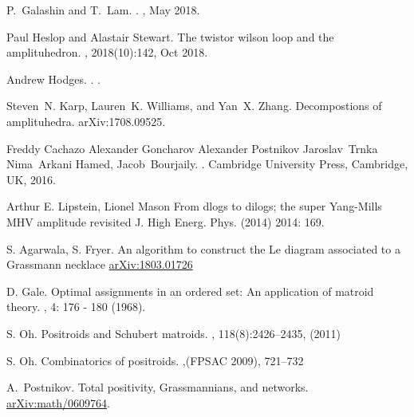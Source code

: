 \documentclass[11pt]{article}
\theoremstyle{remark}
\theoremstyle{definition}
\begin{document}
\begin{thebibliography}{10}
P.~{Galashin} and T.~{Lam}.
.
, May 2018.

Paul Heslop and Alastair Stewart.
\newblock The twistor wilson loop and the amplituhedron.
, 2018(10):142, Oct 2018.

Andrew Hodges.
.
.

Steven~N. Karp, Lauren~K. Williams, and Yan~X. Zhang.
\newblock Decompostions of amplituhedra.
\newblock arXiv:1708.09525.

Freddy Cachazo Alexander Goncharov Alexander Postnikov Jaroslav~Trnka
  Nima~{A}rkani {H}amed, Jacob~Bourjaily.
.
\newblock Cambridge University Press, Cambridge, UK, 2016.

Arthur E. Lipstein, Lionel Mason
\newblock From dlogs to dilogs; the super Yang-Mills MHV amplitude revisited
\newblock J. High Energ. Phys. (2014) 2014: 169.

S. Agarwala, S. Fryer.
\newblock An algorithm to construct the Le diagram associated to a Grassmann necklace
\newblock \url{arXiv:1803.01726}

D. Gale.
\newblock Optimal assignments in an ordered set: {A}n application of matroid theory.
, 4: 176 - 180 (1968).

S. Oh.
\newblock Positroids and {S}chubert matroids.
, 118(8):2426--2435, (2011)

  S. Oh.
  \newblock Combinatorics of positroids.
  ,(FPSAC 2009), 721--732

A.~Postnikov.
\newblock Total positivity, {G}rassmannians, and networks.
\newblock \url{arXiv:math/0609764}.


\end{thebibliography}
\end{document}
